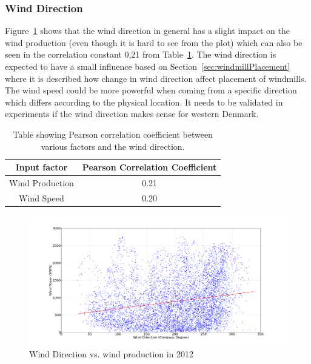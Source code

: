 \subsubsection{Wind Direction}
Figure~\ref{fig:windDirVsProd} shows that the wind direction in general has a slight impact on the wind production (even though it is hard to see from the plot) which can also be seen in the correlation constant 0,21 from Table~\ref{table:pearsonCoeficientWindDirection}. The wind direction is expected to have a small influence based on Section~\ref{sec:windmillPlacement} where it is described how change in wind direction affect placement of windmills. The wind speed could be more powerful when coming from a specific direction which differs according to the physical location. It needs to be validated in experiments if the wind direction makes sense for western Denmark.
 
\begin{table}[H]
\centering  %
\begin{tabular}{|c|c|} %
\hline
Input factor & Pearson Correlation Coefficient \\ %
\hline                  %
Wind Production & 0.21 \\ \hline %
Wind Speed & 0.20 \\ \hline %
\hline %
\end{tabular}
\caption{Table showing Pearson correlation coefficient between various factors and the wind direction.} %
\label{table:pearsonCoeficientWindDirection} %
\end{table}

\begin{figure}[H]
\centering
\includegraphics[width=0.95\linewidth]{billeder/productionVsWindDirection.png}
\caption{Wind Direction vs. wind production in 2012}
\label{fig:windDirVsProd}
\end{figure}

